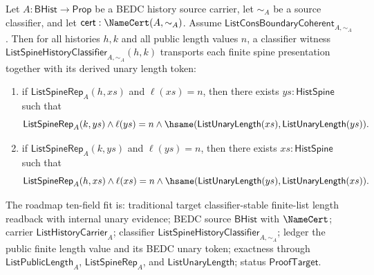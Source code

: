 \begin{theorem}
\label{thm:list-public-length-classifier-unary-token-transport}
Let $A:\mathsf{BHist}\to\mathsf{Prop}$ be a BEDC history source carrier, let
$\sim_A$ be a source classifier, and let
$\mathsf{cert}:\NameCert(A,\sim_A)$. Assume
$\mathsf{ListConsBoundaryCoherent}_{A,\sim_A}$. Then for all histories $h,k$
and all public length values $n$, a classifier witness
$\mathsf{ListSpineHistoryClassifier}_{A,\sim_A}(h,k)$ transports each finite
spine presentation together with its derived unary length token:
\begin{enumerate}
  \item if $\mathsf{ListSpineRep}_A(h,xs)$ and $\ell(xs)=n$, then there exists
  $ys:\mathsf{HistSpine}$ such that
  $$
  \mathsf{ListSpineRep}_A(k,ys)\land
  \ell(ys)=n\land
  \hsame(\mathsf{ListUnaryLength}(xs),\mathsf{ListUnaryLength}(ys)).
  $$
  \item if $\mathsf{ListSpineRep}_A(k,ys)$ and $\ell(ys)=n$, then there exists
  $xs:\mathsf{HistSpine}$ such that
  $$
  \mathsf{ListSpineRep}_A(h,xs)\land
  \ell(xs)=n\land
  \hsame(\mathsf{ListUnaryLength}(ys),\mathsf{ListUnaryLength}(xs)).
  $$
\end{enumerate}
The roadmap ten-field fit is: traditional target classifier-stable finite-list
length readback with internal unary evidence; BEDC source $\mathsf{BHist}$ with
$\NameCert$; carrier $\mathsf{ListHistoryCarrier}_A$; classifier
$\mathsf{ListSpineHistoryClassifier}_{A,\sim_A}$; ledger the public finite
length value and its BEDC unary token; exactness through
$\mathsf{ListPublicLength}_A$, $\mathsf{ListSpineRep}_A$, and
$\mathsf{ListUnaryLength}$; status $\mathsf{ProofTarget}$.
\end{theorem}
